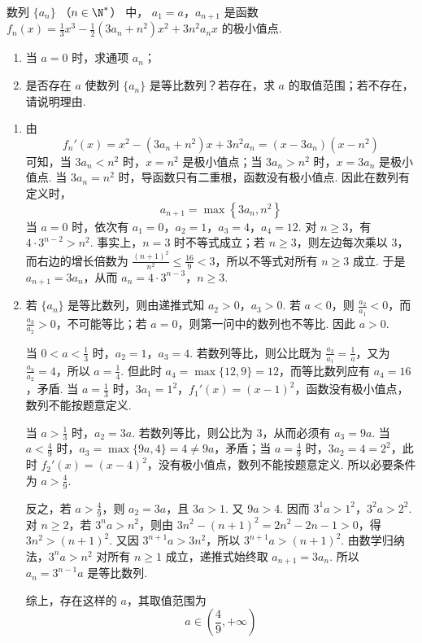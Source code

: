 \begin{problem}
数列 \(\{a_{n}\}\) （\(n\in\N^{*}\)） 中， \(a_1 = a\)，\(a_{n + 1}\) 是函数 \(f_{n}(x) = \frac{1}{3}x^{3} - \frac{1}{2}(3a_n + n^2)x^2 + 3n^2a_nx\) 的极小值点.

\begin{enumerate}
\item 当 \(a = 0\) 时，求通项 \(a_{n}\)；
\item 是否存在 \(a\) 使数列 \(\{a_{n}\}\) 是等比数列？若存在，求 \(a\) 的取值范围；若不存在，请说明理由.
\end{enumerate}

\begin{solution}
\begin{enumerate}
\item 由
\[
f_n'(x)=x^2-(3a_n+n^2)x+3n^2a_n=(x-3a_n)(x-n^2)
\]
可知，当 \(3a_n<n^2\) 时，\(x=n^2\) 是极小值点；当 \(3a_n>n^2\) 时，\(x=3a_n\) 是极小值点. 当 \(3a_n=n^2\) 时，导函数只有二重根，函数没有极小值点. 因此在数列有定义时，
\[
a_{n+1}=\max\left\{3a_n,n^2\right\}
\]
当 \(a=0\) 时，依次有
\(a_1=0\)，\(a_2=1\)，\(a_3=4\)，\(a_4=12\).
对 \(n\geqslant3\)，有 \(4\cdot3^{n-2}>n^2\). 事实上，\(n=3\) 时不等式成立；若 \(n\geqslant3\)，则左边每次乘以 \(3\)，而右边的增长倍数为 \(\frac{(n+1)^2}{n^2}\leqslant\frac{16}{9}<3\)，所以不等式对所有 \(n\geqslant3\) 成立. 于是 \(a_{n+1}=3a_n\)，从而
\(a_n=4\cdot3^{n-3}\)，\(n\geqslant3\).
\item 若 \(\{a_n\}\) 是等比数列，则由递推式知 \(a_2>0\)，\(a_3>0\). 若 \(a<0\)，则 \(\frac{a_2}{a_1}<0\)，而 \(\frac{a_3}{a_2}>0\)，不可能等比；若 \(a=0\)，则第一问中的数列也不等比. 因此 \(a>0\).

当 \(0<a<\frac{1}{3}\) 时，\(a_2=1\)，\(a_3=4\). 若数列等比，则公比既为 \(\frac{a_2}{a_1}=\frac{1}{a}\)，又为 \(\frac{a_3}{a_2}=4\)，所以 \(a=\frac{1}{4}\). 但此时 \(a_4=\max\{12,9\}=12\)，而等比数列应有 \(a_4=16\)，矛盾. 当 \(a=\frac{1}{3}\) 时，\(3a_1=1^2\)，\(f_1'(x)=(x-1)^2\)，函数没有极小值点，数列不能按题意定义.

当 \(a>\frac{1}{3}\) 时，\(a_2=3a\). 若数列等比，则公比为 \(3\)，从而必须有 \(a_3=9a\). 当 \(a<\frac{4}{9}\) 时，\(a_3=\max\{9a,4\}=4\neq9a\)，矛盾；当 \(a=\frac{4}{9}\) 时，\(3a_2=4=2^2\)，此时 \(f_2'(x)=(x-4)^2\)，没有极小值点，数列不能按题意定义. 所以必要条件为 \(a>\frac{4}{9}\).

反之，若 \(a>\frac{4}{9}\)，则 \(a_2=3a\)，且 \(3a>1\). 又 \(9a>4\). 因而
\(3^1a>1^2\)，\(3^2a>2^2\). 对 \(n\geqslant2\)，若 \(3^na>n^2\)，则由 \(3n^2-(n+1)^2=2n^2-2n-1>0\)，得 \(3n^2>(n+1)^2\). 又因 \(3^{n+1}a>3n^2\)，所以 \(3^{n+1}a>(n+1)^2\). 由数学归纳法，\(3^na>n^2\) 对所有 \(n\geqslant1\) 成立，递推式始终取 \(a_{n+1}=3a_n\). 所以 \(a_n=3^{n-1}a\) 是等比数列.

综上，存在这样的 \(a\)，其取值范围为
\[
a\in\left(\frac{4}{9},+\infty\right)
\]
\end{enumerate}
\end{solution}
\end{problem}
